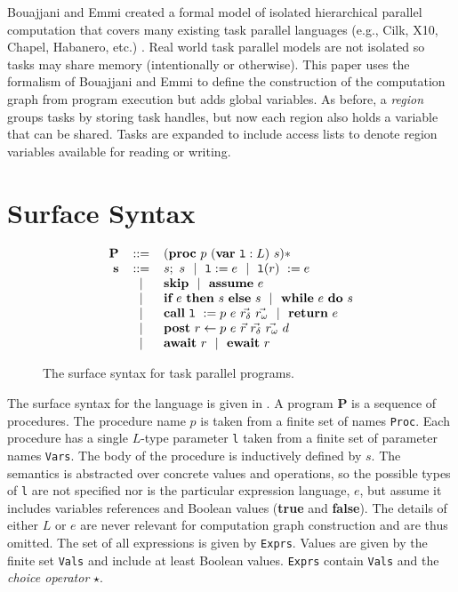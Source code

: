 Bouajjani and Emmi created a formal model of isolated hierarchical parallel computation that covers many existing task parallel languages (e.g., Cilk, X10, Chapel, Habanero, etc.) \cite{bouajjani}. Real world task parallel models are not isolated so tasks may share memory (intentionally or otherwise). This paper uses the formalism of Bouajjani and Emmi to define the construction of the computation graph from program execution but adds global variables. As before, a \emph{region} groups tasks by storing task handles, but now each region also holds a variable that can be shared. Tasks are expanded to include access lists to denote region variables available for reading or writing.  

\section{Surface Syntax}

\begin{figure}
  \begin{center}
\[
  \begin{array}{rcl}
\textbf{P} &::=& (\textbf{proc}~p~(\textbf{var}\ \texttt{l} : L)~s)* \\
\textbf{s} &::=& s;~s \alt \texttt{l} := e \alt \texttt{l}(r)\ := e \\
&\alt& \textbf{skip} \alt  \textbf{assume}~e \\
&\alt& \textbf{if}~e~\textbf{then}~s~\textbf{else}~s \alt \textbf{while}~e~\textbf{do}~s \\
&\alt& \textbf{call}~\texttt{l}\ := p~e~\vec{r_\delta}~\vec{r_\omega} \alt \textbf{return}~e \\
&\alt& \textbf{post}~r \leftarrow p~e~\vec{r}~\vec{r_\delta}~\vec{r_\omega}~d \\
&\alt& \textbf{await}~r \alt \textbf{ewait}~r \\
  \end{array}
\]
  \end{center}
  \caption{The surface syntax for task parallel programs.}
  \label{fig:syntax}
\end{figure}

The surface syntax for the language is given in . A program \textbf{P} is a sequence of procedures. The procedure name $p$ is taken from a finite set of names \texttt{Proc}. Each procedure has a single $L$-type parameter \texttt{l} taken from a finite set of parameter names \texttt{Vars}. The body of the procedure is inductively defined by $s$. The semantics is abstracted over concrete values and operations, so the possible types of \texttt{l} are not specified nor is the particular expression language, $e$, but assume it includes variables references and Boolean values (\textbf{true} and \textbf{false}). The details of either $L$ or $e$ are never relevant for computation graph construction and are thus omitted. The set of all expressions is given by \texttt{Exprs}. Values are given by the finite set \texttt{Vals} and include at least Boolean values. \texttt{Exprs} contain \texttt{Vals} and the \emph{choice operator} $\star$. 

